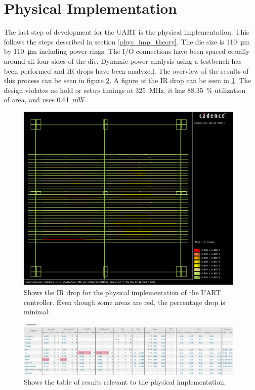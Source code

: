 \documentclass[./dissertation.tex]{subfiles}
\begin{document}
\section{Physical Implementation}
The last step of development for the UART is the physical implementation. This follows the steps described in section \ref{phys_imp_theory}. The die size is \SI{110}{\um} by \SI{110}{\um} including power rings. The I/O connections have been spaced equally around all four sides of the die. Dynamic power analysis using a testbench has been performed and IR drops have been analyzed. The overview of the results of this process can be seen in figure \ref{fig:uart_phys_impl_stats}. A figure of the IR drop can be seen in \ref{fig:uart_irdrop}. The design violates no hold or setup timings at \SI{325}{MHz}, it has \SI{88.35}{\%} utilization of area, and uses \SI{0.61}{mW}.

\begin{figure}[H]
    \centering
    \includegraphics[width=0.85\linewidth]{subfiles/imgs/IP_Blocks_Pics/irdrop.PNG}
    \caption{Shows the IR drop for the physical implementation of the UART controller. Even though some areas are red, the percentage drop is minimal.}
    \label{fig:uart_irdrop}
\end{figure}

\begin{figure}[H]
    \centering
    \includegraphics[scale = 0.4, angle =90]{subfiles/imgs/IP_Blocks_Pics/impl_data.PNG}
    \caption{Shows the table of results relevant to the physical implementation.}
    \label{fig:uart_phys_impl_stats}
\end{figure}



% 
\end{document}
